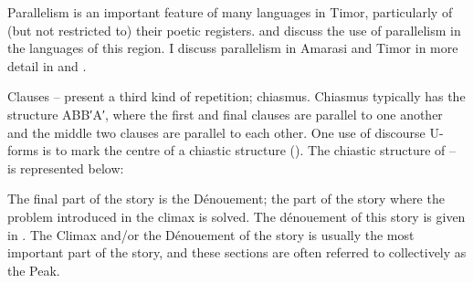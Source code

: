 Parallelism is an important feature of many languages in Timor,
particularly of (but not restricted to) their poetic registers.
\citet{fo88,fo14} and \citet[15ff]{grth97}
discuss the use of parallelism in the languages of this region.
I discuss parallelism in Amarasi and Timor
in more detail in  and .

Clauses --
present a third kind of repetition; chiasmus.
Chiasmus typically has the structure ABB′A′,
where the first and final clauses are parallel to one another
and the middle two clauses are parallel to each other.
One use of discourse U-forms is to mark the centre of a chiastic structure ().
The chiastic structure of --
is represented below:

\begin{exe}
\end{exe}

The final part of the story is the Dénouement; the part of the
story where the problem introduced in the climax is solved.
The dénouement of this story is given in .
The Climax and/or the Dénouement of the story is usually the most important
part of the story, and these sections are often referred to collectively as the Peak.

